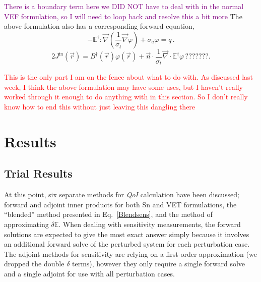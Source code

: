 \documentclass[12pt]{report}
\newcommand{\vr}{\vec{r}}
\renewcommand{\div}{\vec{\nabla} \cdot}
\newcommand{\grad}{\vec{\nabla}}
\newcommand{\vn}{\vec{n}}
\newcommand{\Edd}{\mathbb{E}}
\newcommand{\BEdd}{B}
\newcommand{\sigt}{\sigma_t}
\newcommand{\siga}{\sigma_a}
\newcommand{\scalSource}{q}
\newcommand{\qoi}{{\it QoI}\xspace}
\newcommand{\comment}[2]{\marginpar{\textcolor{#2}{$\star$}}\textcolor{#2}{#1}\newline}
\newcommand{\iwh}[1]{\comment{#1}{red}}
\newcommand{\todo}[1]{\comment{#1}{purple}}
\newcommand{\iwh}[1]{\phantom{a}}
\newcommand{\todo}[1]{\phantom{a}}
\begin{document}
\todo{There is a boundary term here we DID NOT have to deal with in the normal VEF formulation, so I will need to loop back and resolve this a bit more}
The above formulation also has a corresponding forward equation,
\begin{equation}
\label{ForwardVEFAlt}
- \Edd^\dag : \grad \left( \frac{1}{\sigt}\grad \varphi \right) + \siga \varphi  = \scalSource  \,.
\end{equation}
\begin{equation}
2 J^{\text{in}}(\vr) = \BEdd^\dag(\vr) \varphi(\vr) + \vn \cdot \frac{1}{\sigt} \div \Edd^\dag  \varphi  \, ???????.
\end{equation} 

\iwh{This is the only part I am on the fence about what to do with. As discussed last week, I think the above formulation may have some uses, but I haven't really worked through it enough to do anything with in this section. So I don't really know how to end this without just leaving this dangling there}





\chapter{Results}

\section{Trial Results}

At this point, six separate methods for \qoi calculation have been discussed; forward and adjoint inner products for both Sn and VET formulations, the ``blended'' method presented in Eq.~\eqref{Blendsens}, and the method of approximating $\delta \Edd$. When dealing with sensitivity measurements, the forward solutions are expected to give the most exact answer simply because it involves an additional forward solve of the perturbed system for each perturbation case. The adjoint methods for sensitivity are relying on a first-order approximation (we dropped the double $\delta$ terms), however they only require a single forward solve and a single adjoint for use with all perturbation cases. 
\end{document}
